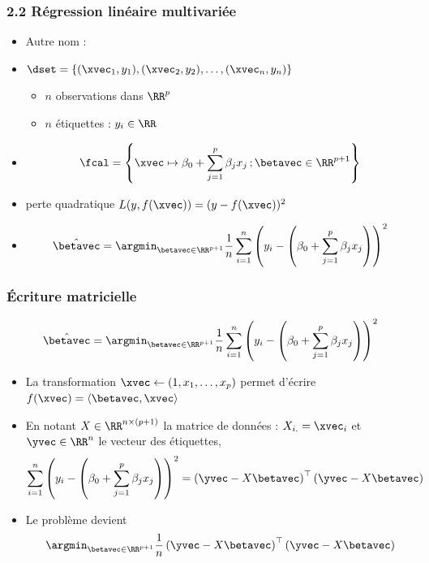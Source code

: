 \begin{frame}
  \frametitle{2.2 Régression linéaire multivariée}
  \begin{itemize}
  \item Autre nom : 
  \item {} $\dset = \{(\xvec_1, y_1), (\xvec_2, y_2), \dots, (\xvec_n, y_n)\}$
    \begin{itemize}
    \item $n$ observations dans $\RR^p$ 
    \item $n$ étiquettes : $y_i \in \RR$
    \end{itemize}
  \item {}
    \[\fcal = \left\{ \xvec \mapsto \beta_0 + \sum_{j=1}^p \beta_j x_j \, ;  \betavec \in \RR^{p+1} \right\}\]
    \pause
    \vspace{-1em}
  \item {} perte quadratique $L(y, f(\xvec)) = (y - f(\xvec))^2$
    \pause
  \item {}
    \[ \hat{\betavec} = \argmin_{\betavec \in \RR^{p+1}} \frac1n \sum_{i=1}^n \left(y_i - \left(\beta_0 + \sum_{j=1}^p \beta_j x_j\right)\right)^2 \]
  \end{itemize}
\end{frame}

\begin{frame}
  \frametitle{Écriture matricielle}
  \small
    \[ \hat{\betavec} = \argmin_{\betavec \in \RR^{p+1}} \frac1n \sum_{i=1}^n \left(y_i - \left(\beta_0 + \sum_{j=1}^p \beta_j x_j\right)\right)^2 \]
  \begin{itemize}
  \item La transformation 
    $\xvec \leftarrow (1, x_1, \dots, x_p)$ permet d'écrire $f(\xvec) = \langle \betavec, \xvec \rangle$ 
  \item En notant $X \in \RR^{n \times (p+1)}$ la matrice de données : $X_{i.} = \xvec_i$ et \\
    $\yvec \in \RR^n$ le vecteur des étiquettes,
    \[\sum_{i=1}^n \left(y_i - \left(\beta_0 + \sum_{j=1}^p \beta_j x_j\right)\right)^2 =
    \left(\yvec - X \betavec \right)^\top \left(\yvec - X \betavec \right)\]
\item Le problème devient 
    \[\argmin_{\betavec \in \RR^{p+1}} \frac1n 
    \left(\yvec - X \betavec \right)^\top \left(\yvec - X \betavec \right)\]
  \end{itemize}
\end{frame}


